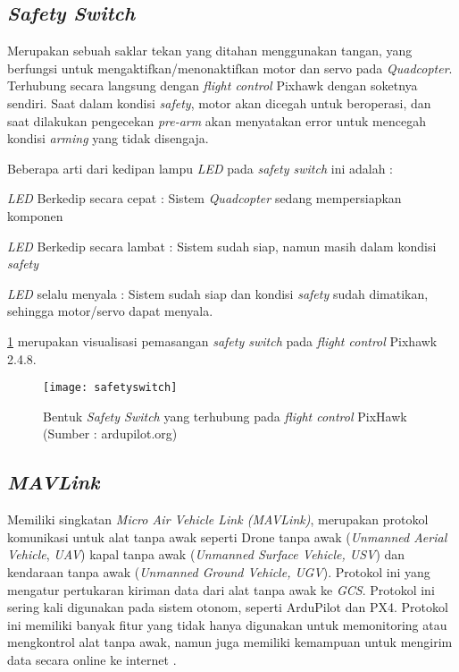 \subsection{\textit{Safety Switch}}
Merupakan sebuah saklar tekan yang ditahan menggunakan tangan, yang berfungsi untuk mengaktifkan/menonaktifkan motor dan servo pada \textit{Quadcopter}. Terhubung secara langsung dengan \textit{flight control} Pixhawk dengan soketnya sendiri. Saat dalam kondisi \textit{safety}, motor akan dicegah untuk beroperasi, dan saat dilakukan pengecekan \textit{pre-arm} akan menyatakan error untuk mencegah kondisi \textit{arming} yang tidak disengaja.

Beberapa arti dari kedipan lampu \textit{LED} pada \textit{safety switch} ini adalah :

\begin{packed_item}
	\item \textit{LED} Berkedip secara cepat : Sistem \textit{Quadcopter} sedang mempersiapkan komponen
	\item \textit{LED} Berkedip secara lambat : Sistem sudah siap, namun masih dalam kondisi \textit{safety}
	\item \textit{LED} selalu menyala : Sistem sudah siap dan kondisi \textit{safety} sudah dimatikan, sehingga motor/servo dapat menyala.
\end{packed_item}

\cref{fig:safetyswitch} merupakan visualisasi pemasangan \textit{safety switch} pada \textit{flight control} Pixhawk 2.4.8.

\begin{figure}[H]
	\centering
	\texttt{[image: safetyswitch]}
	\caption{Bentuk \textit{Safety Switch} yang terhubung pada \textit{flight control} PixHawk (Sumber : ardupilot.org)}
	\label{fig:safetyswitch}
\end{figure}

\subsection{\textit{MAVLink}}
Memiliki singkatan \textit{Micro Air Vehicle Link (MAVLink)}, merupakan protokol komunikasi untuk alat tanpa awak seperti Drone tanpa awak (\textit{Unmanned Aerial Vehicle}, \textit{UAV}) kapal tanpa awak (\textit{Unmanned Surface Vehicle, USV})  dan kendaraan tanpa awak (\textit{Unmanned Ground Vehicle, UGV}). Protokol ini yang mengatur pertukaran kiriman data dari alat tanpa awak ke \textit{GCS}. Protokol ini sering kali digunakan pada sistem otonom, seperti ArduPilot dan PX4. Protokol ini memiliki banyak fitur yang tidak hanya digunakan untuk memonitoring atau mengkontrol alat tanpa awak, namun juga memiliki kemampuan untuk mengirim data secara online ke internet \citep{koubaa2019micro}.

